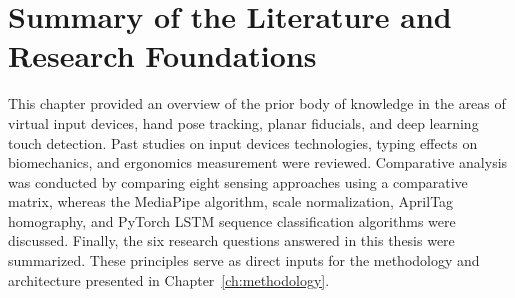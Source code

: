 \section{Summary of the Literature and Research Foundations}
\label{sec:lit_chapter_summary}
This chapter provided an overview of the prior body of knowledge in the areas of virtual input devices, hand pose tracking, planar fiducials, and deep learning touch detection. Past studies on input devices technologies, typing effects on biomechanics, and ergonomics measurement were reviewed. Comparative analysis was conducted by comparing eight sensing approaches using a comparative matrix, whereas the MediaPipe algorithm, scale normalization, AprilTag homography, and PyTorch LSTM sequence classification algorithms were discussed. Finally, the six research questions answered in this thesis were summarized. These principles serve as direct inputs for the methodology and architecture presented in Chapter~\ref{ch:methodology}.
